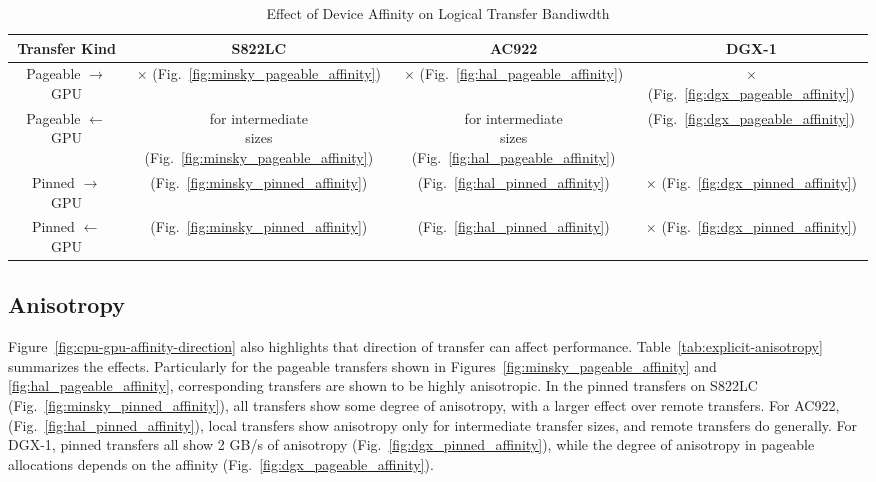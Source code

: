 \begin{table}[ht]
	\centering
	\caption[Affinity and Logical Communication Bandwidth]{Effect of Device Affinity on Logical Transfer Bandiwdth}
	\label{tab:cpu-gpu-affinity}
	\begin{tabular}{|c|c|c|c|}
		\hline
		\textbf{Transfer Kind}     & \textbf{S822LC}                                    & \textbf{AC922}                                    & \textbf{DGX-1}                                  \\ \hline 
		Pageable $\rightarrow$ GPU & $\times$ (Fig.~\ref{fig:minsky_pageable_affinity}) & $\times$   (Fig.~\ref{fig:hal_pageable_affinity}) & $\times$ (Fig.~\ref{fig:dgx_pageable_affinity}) \\ \hline
		Pageable $\leftarrow$ GPU  & \makecell{ for intermediate \\ sizes (Fig.~\ref{fig:minsky_pageable_affinity}) } & \makecell{ for intermediate \\ sizes (Fig.~\ref{fig:hal_pageable_affinity}) } & \checkmark (Fig.~\ref{fig:dgx_pageable_affinity}) \\ \hline
		Pinned $\rightarrow$ GPU   & \checkmark (Fig.~\ref{fig:minsky_pinned_affinity}) & \checkmark (Fig.~\ref{fig:hal_pinned_affinity})   & $\times$  (Fig.~\ref{fig:dgx_pinned_affinity})  \\ \hline
		Pinned $\leftarrow$ GPU    & \checkmark (Fig.~\ref{fig:minsky_pinned_affinity}) & \checkmark (Fig.~\ref{fig:hal_pinned_affinity})   & $\times$ (Fig.~\ref{fig:dgx_pinned_affinity})   \\ \hline
	\end{tabular}
\end{table}

\subsection{Anisotropy}
\label{sec:explicit-cpu-gpu-anisotropy}

Figure~\ref{fig:cpu-gpu-affinity-direction} also highlights that direction of transfer can affect performance.
Table~\ref{tab:explicit-anisotropy} summarizes the effects.
Particularly for the pageable transfers shown in Figures~\ref{fig:minsky_pageable_affinity} and \ref{fig:hal_pageable_affinity}, corresponding transfers are shown to be highly anisotropic.
In the pinned transfers on S822LC (Fig.~\ref{fig:minsky_pinned_affinity}), all transfers show some degree of anisotropy, with a larger effect over remote transfers.
For AC922, (Fig.~\ref{fig:hal_pinned_affinity}), local transfers show anisotropy only for intermediate transfer sizes, and remote transfers do generally.
For DGX-1, pinned transfers all show 2 GB/s of anisotropy (Fig.~\ref{fig:dgx_pinned_affinity}), while the degree of anisotropy in pageable allocations depends on the affinity (Fig.~\ref{fig:dgx_pageable_affinity}).

